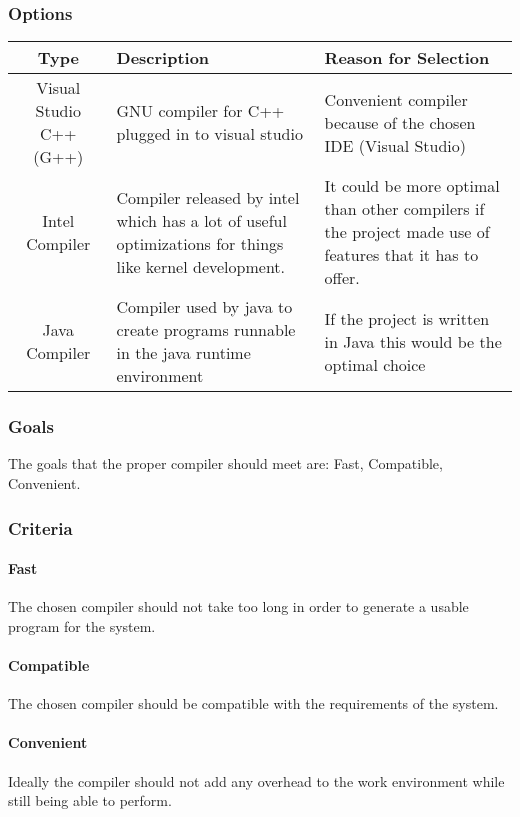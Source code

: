 \documentclass[10pt,letterpaper,onecolumn,draftclsnofoot]{IEEEtran}
\begin{document}
\subsubsection{Options}
\begin{center}
	\begin{tabular}{ ||C|L|L|| } 
		\hline
		Type & Description & Reason for Selection \\
		\hline
		Visual Studio C++ (G++) & GNU compiler for C++ plugged in to visual studio & Convenient compiler because of the chosen IDE (Visual Studio) \\ 
		\hline
		Intel Compiler & Compiler released by intel which has a lot of useful optimizations for things like kernel development. & It could be more optimal than other compilers if the project made use of features that it has to offer. \\ 
		\hline
		Java Compiler & Compiler used by java to create programs runnable in the java runtime environment & If the project is written in Java this would be the optimal choice \\ 
		\hline
	\end{tabular}
\end{center}
\subsubsection{Goals}
The goals that the proper compiler should meet are: Fast, Compatible, Convenient.
\subsubsection{Criteria}
\paragraph{Fast}
The chosen compiler should not take too long in order to generate a usable program for the system.
\paragraph{Compatible}
The chosen compiler should be compatible with the requirements of the system.
\paragraph{Convenient}
Ideally the compiler should not add any overhead to the work environment while still being able to perform.
\end{document}
